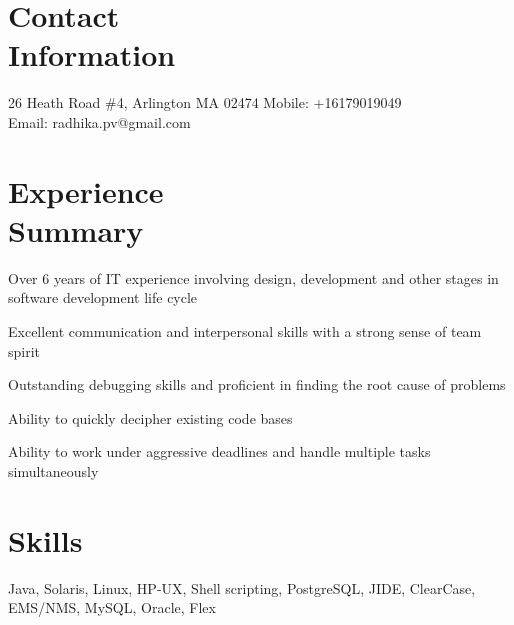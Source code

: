 \documentclass[margin]{resume}
\begin{document}
\begin{resume}

    \section{\mysidestyle Contact\\Information}

    26 Heath Road \#4, Arlington MA 02474   \hfill Mobile: +16179019049          \\
    Email: radhika.pv@gmail.com \\

			\vspace{-5mm}
    \section{\mysidestyle Experience \\ Summary}
		\begin{list2}
    \item Over 6 years of IT experience involving design, development and other stages in software development life cycle
    \item Excellent communication and interpersonal skills with a strong sense of team spirit
    \item Outstanding debugging skills and proficient in finding the root cause of problems
    \item Ability to quickly decipher existing code bases
		\item Ability to work under aggressive deadlines and handle multiple tasks simultaneously
		\end{list2}

    \section{\mysidestyle Skills}
		Java, Solaris, Linux, HP-UX, Shell scripting, PostgreSQL, JIDE, ClearCase, EMS/NMS, MySQL, Oracle, Flex


\end{resume}
\end{document}
